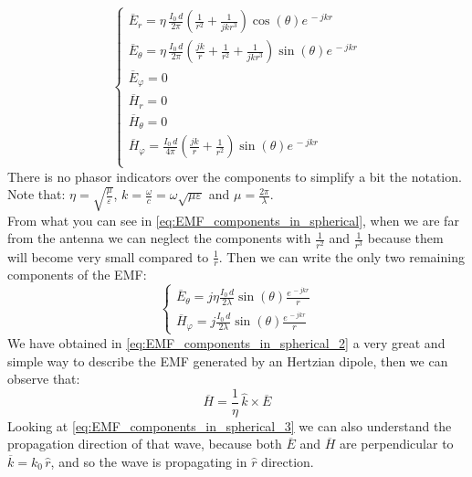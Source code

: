 \begin{equation}\label{eq:EMF_components_in_spherical}
    \begin{cases}
        \overline{E}_r=\eta \, \frac{I_0\, d}{2\pi}\left(\frac{1}{r^2}+\frac{1}{jkr^3}\right)\cos(\theta)e^{\,-jkr}\\[5pt]
        \overline{E}_\theta=\eta\,\frac{I_0\,d}{2\pi}\left(\frac{jk}{r}+\frac{1}{r^2}+\frac{1}{jkr^3}\right)\sin(\theta)e^{\,-jkr}\\[5pt]
        \overline{E}_\varphi=0\\[5pt]
        \overline{H}_r=0\\[5pt]
        \overline{H}_\theta=0\\[5pt]
        \overline{H}_\varphi=\frac{I_0\,d}{4\pi}\left(\frac{jk}{r}+\frac{1}{r^2}\right)\sin(\theta)e^{\,-jkr}\\[5pt]
    \end{cases}
\end{equation}
There is no phasor indicators over the components to simplify a bit the notation.\\
Note that: $\eta =\sqrt{\frac{\mu}{\varepsilon}}$, $k=\frac{\omega}{c}=\omega\sqrt{\mu\varepsilon}$ and $\mu=\frac{2\pi}{\lambda}$.\\
From what you can see in \cref{eq:EMF_components_in_spherical}, when we are far from the antenna we can neglect the components with $\frac{1}{r^2}$ and $\frac{1}{r^3}$ because them will become very small compared to $\frac{1}{r}$. Then we can write the only two remaining components of the EMF:
\begin{equation}\label{eq:EMF_components_in_spherical_2}
\begin{cases}
    \overline{E}_\theta = j\eta \frac{I_0\,d}{2\lambda}\sin(\theta)\frac{e^{\,-jkr}}{r}\\
    \overline{H}_\varphi = j\frac{I_0\,d}{2\lambda}\sin(\theta)\frac{e^{\,-jkr}}{r}
\end{cases}
\end{equation}
We have obtained in \cref{eq:EMF_components_in_spherical_2} a very great and simple way to describe the EMF generated by an Hertzian dipole, then we can observe that:
\begin{equation}\label{eq:EMF_components_in_spherical_3}
    \overline{H}=\frac{1}{\eta}\,\hat{k}\times\overline{E} 
\end{equation}
Looking at \cref{eq:EMF_components_in_spherical_3} we can also understand the propagation direction of that wave, because both $\overline{E}$ and $\overline{H}$ are perpendicular to $\overline{k}=k_0\,\hat{r}$, and so the wave is propagating in $\hat{r}$ direction.\\
